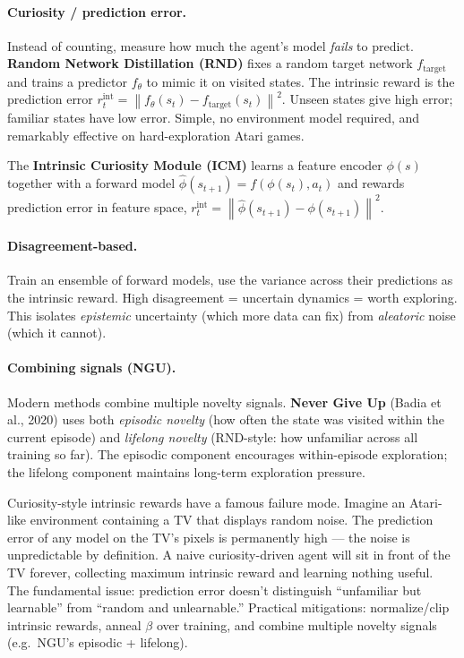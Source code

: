 \documentclass[11pt, oneside]{book}
\newcommand{\norm}[1]{\left\lVert #1 \right\rVert}
\begin{document}
\paragraph{Curiosity / prediction error.}
Instead of counting, measure how much the agent's model \emph{fails} to predict.
\textbf{Random Network Distillation (RND)} fixes a random target network $f_{\text{target}}$
and trains a predictor $f_\theta$ to mimic it on visited states.
The intrinsic reward is the prediction error
$r_t^{\text{int}} = \norm{f_\theta(s_t) - f_{\text{target}}(s_t)}^2$. Unseen states give
high error; familiar states have low error. Simple, no environment model required, and
remarkably effective on hard-exploration Atari games.

The \textbf{Intrinsic Curiosity Module (ICM)} learns a feature encoder $\phi(s)$ together
with a forward model $\hat\phi(s_{t+1}) = f(\phi(s_t), a_t)$ and rewards prediction error
in feature space, $r_t^{\text{int}} = \norm{\hat\phi(s_{t+1}) - \phi(s_{t+1})}^2$.

\paragraph{Disagreement-based.}
Train an ensemble of forward models, use the variance across their predictions as
the intrinsic reward. High disagreement = uncertain dynamics = worth exploring.
This isolates \emph{epistemic} uncertainty (which more data can fix) from
\emph{aleatoric} noise (which it cannot).

\paragraph{Combining signals (NGU).}
Modern methods combine multiple novelty signals.
\textbf{Never Give Up} (Badia et al., 2020) uses both \emph{episodic novelty} (how
often the state was visited within the current episode) and \emph{lifelong novelty}
(RND-style: how unfamiliar across all training so far).
The episodic component encourages within-episode exploration; the lifelong component
maintains long-term exploration pressure.

\begin{notebox}[title={The noisy-TV problem}]
Curiosity-style intrinsic rewards have a famous failure mode.
Imagine an Atari-like environment containing a TV that displays random noise. The
prediction error of any model on the TV's pixels is permanently high --- the noise
is unpredictable by definition. A naive curiosity-driven agent will sit in front of
the TV forever, collecting maximum intrinsic reward and learning nothing useful.
The fundamental issue: prediction error doesn't distinguish ``unfamiliar but learnable''
from ``random and unlearnable.''
Practical mitigations: normalize/clip intrinsic rewards, anneal $\beta$ over training,
and combine multiple novelty signals (e.g.\ NGU's episodic + lifelong).
\end{notebox}
\end{document}

